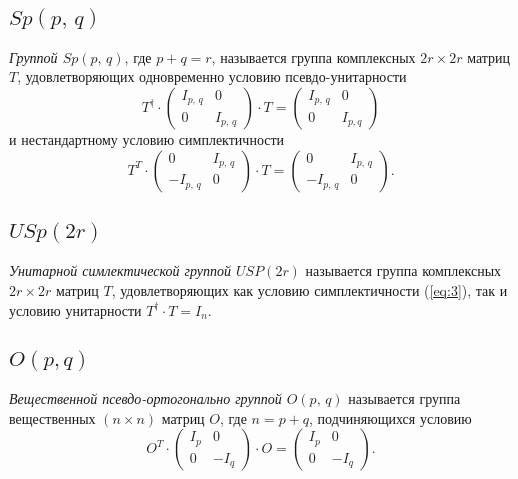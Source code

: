 \documentclass[a4paper,12pt]{article}
\begin{document}
\subsection{$Sp(p,\, q)$ }
\begin{dfn}
	\emph{ Группой $Sp(p,\,q)$}, где $p+q=r$, называется группа
	комплексных $2r \times 2r$ матриц $T$, удовлетворяющих одновременно
	условию псевдо-унитарности
	\begin{equation}
	T^\dag \cdot \begin{pmatrix} 
	I_{p,\, q} & 0\\
0 & I_{p,\,q}
\end{pmatrix} \cdot T= \begin{pmatrix}
I_{p,\,q} & 0\\
0 & I_{p,q}\end{pmatrix} 
	\end{equation}
	и нестандартному условию симплектичности
	\begin{equation}
		T^T \cdot \begin{pmatrix} 0 & I_{p,\,q} \\ -I_{p,\,q} & 0 \end{pmatrix} 
		\cdot T= \begin{pmatrix} 0 & I_{p,\,q} \\ -I_{p,\,q} & 0 \end{pmatrix} 
	.\end{equation}
\end{dfn}

\subsection{$USp(2r)$ }
\begin{dfn}
	\emph{Унитарной симлектической группой $USP(2r)$} называется
	группа комплексных $2r \times 2r$ матриц $T$, удовлетворяющих как условию
	симплектичности  (\ref{eq:3}), так и условию унитарности $T^\dag \cdot
	T=I_n$.
\end{dfn}
\subsection{$O(p, q)$ }
\begin{dfn}
	\emph{Вещественной псевдо-ортогонально группой $O(p,\,q)$} называется
	группа вещественных $(n \times n)$ матриц $O$, где $n=p+q$, подчиняющихся
	условию
	\begin{equation}
		O^T \cdot
		\begin{pmatrix} 
		I_p & 0 \\
	0 & -I_q
\end{pmatrix}
\cdot O = 
\begin{pmatrix} 
I_p & 0 \\
0 & -I_q\end{pmatrix} 
	.
	\label{eq:6}
	\end{equation}
\end{dfn}
\end{document}

